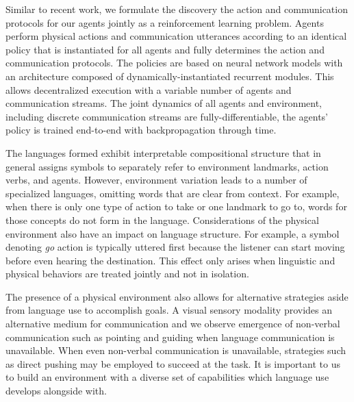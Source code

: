 \documentclass[letterpaper]{article} %
\begin{document}
Similar to recent work,%
we formulate the discovery the action and communication protocols for our agents jointly as a reinforcement learning problem. Agents perform physical actions and communication utterances according to an identical policy that is instantiated for all agents and fully determines the action and communication protocols. The policies are based on neural network models with an architecture composed of dynamically-instantiated recurrent modules. This allows decentralized execution with a variable number of agents and communication streams. The joint dynamics of all agents and environment, including discrete communication streams are fully-differentiable, the agents' policy is trained end-to-end with backpropagation through time.

The languages formed exhibit interpretable compositional structure that in general assigns symbols to separately refer to environment landmarks, action verbs, and agents. However, environment variation leads to a number of specialized languages, omitting words that are clear from context. For example, when there is only one type of action to take or one landmark to go to, words for those concepts do not form in the language. Considerations of the physical environment also have an impact on language structure. For example, a symbol denoting \emph{go} action is typically uttered first because the listener can start moving before even hearing the destination. This effect only arises when linguistic and physical behaviors are treated jointly and not in isolation.

The presence of a physical environment also allows for alternative strategies aside from language use to accomplish goals. A visual sensory modality provides an alternative medium for communication and we observe emergence of non-verbal communication such as pointing and guiding when language communication is unavailable. When even non-verbal communication is unavailable, strategies such as direct pushing may be employed to succeed at the task. It is important to us to build an environment with a diverse set of capabilities which language use develops alongside with.

\end{document}
